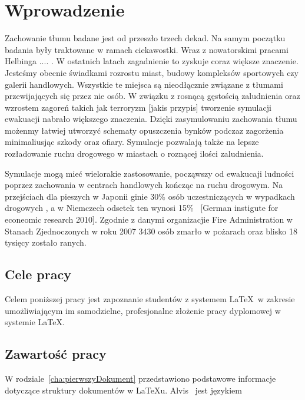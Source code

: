 \chapter{Wprowadzenie}
\label{cha:wprowadzenie}

Zachowanie tłumu badane jest od przeszło trzech dekad. Na samym początku badania były traktowane w ramach ciekawostki. Wraz z nowatorskimi pracami Helbinga .... . W ostatnich latach zagadnienie to zyskuje coraz większe znaczenie. Jesteśmy obecnie świadkami rozrostu miast, budowy kompleksów sportowych czy galerii handlowych. Wszystkie te miejsca są nieodłącznie związane z tłumami przewijających się przez nie osób. W związku z rosnącą gęstością zaludnienia oraz wzrostem zagoreń takich jak terroryzm [jakis przypis] tworzenie symulacji ewakuacji nabrało większego znaczenia. Dzięki zasymulowaniu zachowania tłumu możenmy łatwiej utworzyć schematy opuszczenia bynków podczaz zagorżenia minimaliusjąc szkody oraz ofiary. Symulacje pozwalają także na lepsze rozładowanie ruchu drogowego w miastach o roznącej ilości zaludnienia.

Symulacje mogą mieć wielorakie zastosowanie, począwszy od ewakucaji ludności poprzez zachowania w centrach handlowych kończąc na ruchu drogowym. Na przejściach dla pieszych w Japonii ginie 30\% osób uczestniczących w wypadkach drogowych \cite{AMSFMfPBSaSC}, a w Niemczech odsetek ten wynosi 15\% \ [German instigute for econeomic research 2010]. Zgodnie z danymi organizacjie Fire Administration w Stanach Zjednoczonych \cite{Asfemwle} w roku 2007 3430 osób zmarło w pożarach oraz blisko 18 tysięcy zostało ranych.


\section{Cele pracy}
\label{sec:celePracy}

Celem poniższej pracy jest zapoznanie studentów z systemem \LaTeX~w zakresie umożliwiającym im samodzielne, profesjonalne złożenie pracy dyplomowej w systemie \LaTeX.


\section{Zawartość pracy}
\label{sec:zawartoscPracy}

W rodziale~\ref{cha:pierwszyDokument} przedstawiono podstawowe informacje dotyczące struktury dokumentów w \LaTeX u. Alvis~\cite{Alvis2011} jest językiem 



















